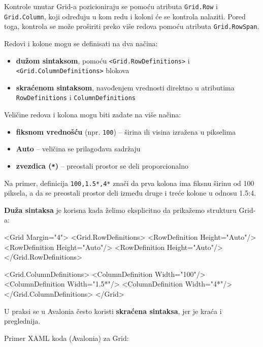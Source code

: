 \documentclass[11pt,a4paper]{article}
\begin{document}
Kontrole unutar Grid-a pozicioniraju se pomoću atributa \texttt{Grid.Row} i \texttt{Grid.Column}, koji određuju u kom redu i koloni će se kontrola nalaziti. Pored toga, kontrola se može proširiti preko više redova pomoću atributa \texttt{Grid.RowSpan}.

Redovi i kolone mogu se definisati na dva načina:

\begin{itemize}[leftmargin=*]
  \item \textbf{dužom sintaksom}, pomoću \texttt{<Grid.RowDefinitions>} i \texttt{<Grid.ColumnDefinitions>} blokova
  \item \textbf{skraćenom sintaksom}, navođenjem vrednosti direktno u atributima \texttt{RowDefinitions} i \texttt{ColumnDefinitions}
\end{itemize}

Veličine redova i kolona mogu biti zadate na više načina:

\begin{itemize}[leftmargin=*]
  \item \textbf{fiksnom vrednošću} (npr. \texttt{100}) -- širina ili visina izražena u pikselima
  \item \textbf{Auto} -- veličina se prilagođava sadržaju
  \item \textbf{zvezdica (\texttt{*})} -- preostali prostor se deli proporcionalno
\end{itemize}

Na primer, definicija \texttt{100,1.5*,4*} znači da prva kolona ima fiksnu širinu od 100 piksela, a da se preostali prostor deli između druge i treće kolone u odnosu 1.5:4.

\textbf{Duža sintaksa} je korisna kada želimo eksplicitno da prikažemo strukturu Grid-a:

\begin{CodeBlock}
<Grid Margin="4">
  <Grid.RowDefinitions>
    <RowDefinition Height="Auto"/>
    <RowDefinition Height="Auto"/>
    <RowDefinition Height="Auto"/>
  </Grid.RowDefinitions>

  <Grid.ColumnDefinitions>
    <ColumnDefinition Width="100"/>
    <ColumnDefinition Width="1.5*"/>
    <ColumnDefinition Width="4*"/>
  </Grid.ColumnDefinitions>
</Grid>
\end{CodeBlock}

U praksi se u Avalonia često koristi \textbf{skraćena sintaksa}, jer je kraća i preglednija.

Primer XAML koda (Avalonia) za Grid:
\end{document}
